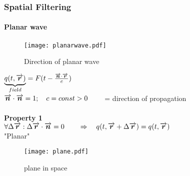 \subsubsection{Spatial Filtering}
\paragraph{Planar wave}
\begin{figure}[H]
	\centering
	\texttt{[image: planarwave.pdf]}
	\caption{Direction of planar wave}
	\label{planarwave} 
\end{figure}
$\underbrace{q(t,\overrightarrow{\boldsymbol {r}})}_{field}=F(t-\frac{\overrightarrow{\boldsymbol {n}}\cdot \overrightarrow{\boldsymbol {r}}}{c})$\\
$\overrightarrow{\boldsymbol {n}}\cdot \overrightarrow{\boldsymbol {n}}=1; \quad c=const >0 \qquad$ = direction of propagation\\ \ \\
\textbf{Property 1}\\
$\forall \Delta \overrightarrow{\boldsymbol {r}}: \Delta \overrightarrow{\boldsymbol {r}} \cdot \overrightarrow{\boldsymbol {n}} = 0 \quad \quad\Rightarrow\quad q(t,\overrightarrow{\boldsymbol {r}}+\Delta \overrightarrow{\boldsymbol {r}})= q(t,\overrightarrow{\boldsymbol {r}})$\\
"Planar"
\begin{figure}[H]
	\centering
	\texttt{[image: plane.pdf]}
	\caption{plane in space}
	\label{plane} 
\end{figure}

